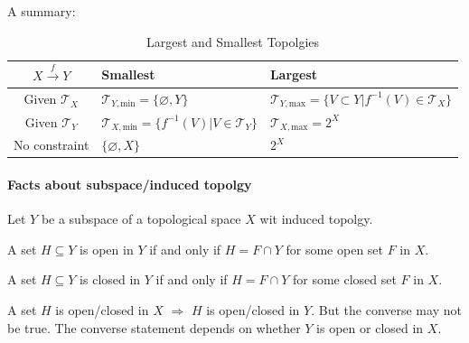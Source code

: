 \documentclass{article}
\begin{document}
A summary:
\begin{table}[H]
    \centering
    \caption{Largest and Smallest Topolgies}
    \begin{tabular}{c l l}
        $X\overset{f}{\to}Y$ & Smallest  &Largest \\
        \hline
        Given $\mathcal{T}_X$ & $\mathcal{T}_{Y,\text{min}}=\{\varnothing,Y\}$        & $\mathcal{T}_{Y,\text{max}}=\{ V\subset Y| f^{-1}(V)\in \mathcal{T}_X\}$\\
        Given $\mathcal{T}_Y$ & $\mathcal{T}_{X,\text{min}}=\{f^{-1}(V)|V\in\mathcal{T}_Y\}$ & $\mathcal{T}_{X,\text{max}}=2^X$ \\
        No constraint & $\{\varnothing,X\}$ & $2^X$ \\
        \hline
    \end{tabular}
\end{table}
\paragraph{Facts about subspace/induced topolgy}
Let $Y$ be a subspace of a topological space $X$ wit induced topolgy.
\begin{fact}
    A set $H\subseteq Y$ is open in $Y$ if and only if $H=F\cap Y$
    for some open set $F$ in $X$.
\end{fact}
\begin{fact}
    A set $H\subseteq Y$ is closed in $Y$ if and only if $H=F\cap Y$
    for some closed set $F$ in $X$.
\end{fact}
\begin{fact}
    A set $H$ is open/closed in $X$ $\Rightarrow$ $H$ is open/closed
    in $Y$. But the converse may not be true. The converse statement
    depends on whether $Y$ is open or closed in $X$.
\end{fact}
\end{document}
